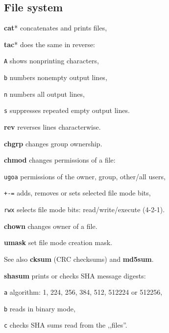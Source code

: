 \subsection*{File system}
\begin{enumx}
	\item [\cmd] \textbf{cat}* concatenates and prints files,
	
	\item [\cmd] \textbf{tac}* does the same in reverse: %
	\item [\texttt{A}] shows nonprinting characters,
	\item [\texttt{b}] numbers nonempty output lines,
	\item [\texttt{n}] numbers all output lines,
	\item [\texttt{s}] suppresses repeated empty output lines.
	
	\item [\cmd] \textbf{rev} reverses lines characterwise.
\end{enumx}

\begin{enumx}
	\item [\cmd] \textbf{chgrp} changes group ownership.
	
	\item [\cmd] \textbf{chmod} changes permissions of a file:
	\item [\texttt{ugoa}] permissions of the owner, group, other/all users,
	\item [\texttt{+-=}] adds, removes or sets selected file mode bits,
	\item [\texttt{rwx}] selects file mode bits: read/write/execute (4-2-1).
	
	\item [\cmd] \textbf{chown} changes owner of a file.
	
	\item [\cmd] \textbf{umask} set file mode creation mask.
\end{enumx}

\begin{enumx}
	\item [\cmd] See also \textbf{cksum} (CRC checksums) and \textbf{md5sum}.
	
	\item [\cmd] \textbf{shasum} prints or checks SHA message digests:
	\item [\texttt{a}] algorithm: 1, 224, 256, 384, 512, 512224 or 512256,
	\item [\texttt{b}] reads in binary mode,
	\item [\texttt{c}] checks SHA sums read from the ,,files''.
\end{enumx}

